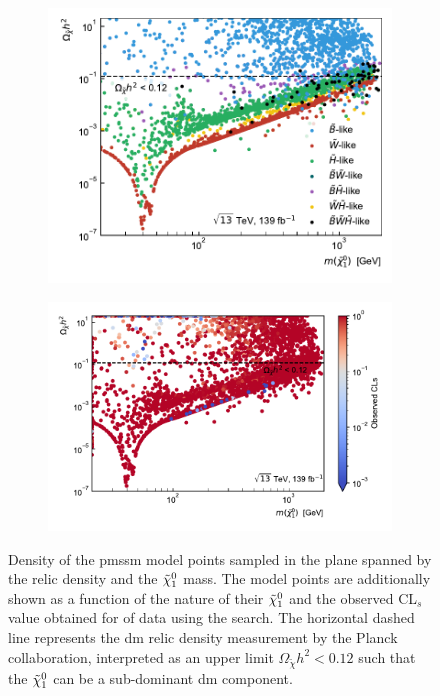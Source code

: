  \begin{figure}
	\centering
	\begin{subfigure}[b]{0.445\linewidth}
		\centering\includegraphics[width=\textwidth]{scatter/relic_density_lsp}
		\caption{\label{fig:relic_density_lsp}}
	\end{subfigure}\hfill
	\begin{subfigure}[b]{0.555\linewidth}
		\centering\includegraphics[width=\textwidth]{scatter/relic_density_lsp_cls}
		\caption{\label{fig:relic_density_lsp_cls}}
	\end{subfigure}\hfill
	\caption{Density of the \gls{pmssm} model points sampled in the plane spanned by the relic density and the $\tilde{\chi}_1^0$ mass. The model points are additionally shown as a function of  the nature of their $\tilde{\chi}_1^0$ and  the observed CL$_s$ value obtained for \onethirtynineifb of data using the \onelepton search. The horizontal dashed line represents the \gls{dm} relic density measurement by the Planck collaboration, interpreted as an upper limit $\Omega_{\tilde{\chi}} h^2 < 0.12$ such that the $\tilde{\chi}_1^0$ can be a sub-dominant \gls{dm} component.}
	\label{fig:relic_density}
\end{figure}

